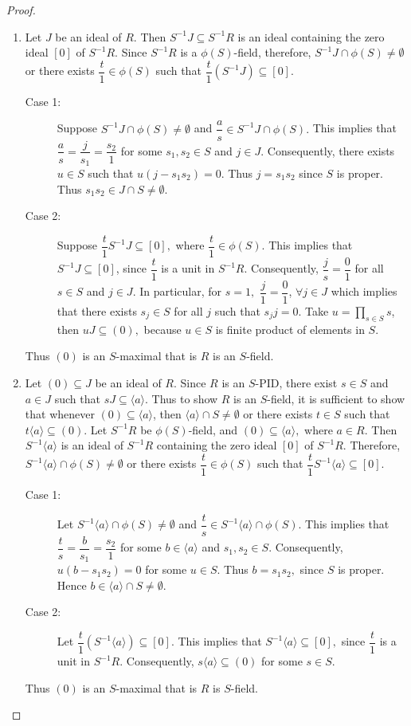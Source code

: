 \documentclass[10pt,a4paper]{amsart}
\begin{document}
	\begin{proof}
		\begin{enumerate}
			\item Let $J$ be an ideal of $R$. Then $S^{-1}J\subseteq S^{-1}R$ is an ideal containing the zero ideal $[0]$ of $S^{-1}R.$ Since $S^{-1}R$ is a $\phi(S)$-field, therefore, $S^{-1}J\cap \phi(S)\neq \emptyset $ or there exists $\dfrac{t}{1}\in \phi(S)$ such that $\dfrac{t}{1}(S^{-1}J)\subseteq [0].$
			\begin{description}
				\item[Case 1:] Suppose $S^{-1}J\cap \phi(S)\neq \emptyset$ and $\dfrac{a}{s}\in S^{-1}J\cap \phi(S).$ This implies that $\dfrac{a}{s}=\dfrac{j}{s_1}=\dfrac{s_2}{1}$ for some $s_1,s_2\in S$ and $j\in J.$ Consequently, there exists $u\in S$ such that $u(j-s_1s_2)=0$. Thus $j=s_1s_2$ since $S$ is proper. Thus $s_1s_2\in J\cap S\neq \emptyset$.
				\item[Case 2:] Suppose $\dfrac{t}{1}S^{-1}J\subseteq [0],$ where $\dfrac{t}{1}\in \phi(S)$. This implies that $S^{-1}J\subseteq [0]$, since $\dfrac{t}{1}$ is a unit in $S^{-1}R.$ Consequently, $\dfrac{j}{s}=\dfrac{0}{1}$ for all $s\in S$ and $j\in J.$ In particular, for $s=1,$ $\dfrac{j}{1}=\dfrac{0}{1}$, $\forall j\in J$ which implies that there exists $s_j\in S$ for all $j$ such that $s_j j=0.$ Take $u=\prod_{s\in S} s$, then $uJ\subseteq (0),$ because $u\in S$ is finite product of elements in $S.$
			\end{description}
			Thus $(0)$ is an $S$-maximal that is $R$ is an $S$-field.
			\item Let $(0)\subseteq J$ be an ideal of $R.$ Since $R$ is an $S$-PID, there exist $s\in S$ and $a\in J$ such that $sJ\subseteq \langle a\rangle.$ Thus to show $R$ is an $S$-field, it is sufficient to show that whenever $(0)\subseteq \langle a\rangle$, then $\langle a\rangle \cap S\neq \emptyset$ or there exists $t\in S$ such that $t\langle a\rangle\subseteq (0).$ 
			Let $S^{-1}R$ be $\phi(S)$-field, and $(0)\subseteq \langle a\rangle,$ where $a\in R$. Then $S^{-1}\langle a \rangle$ is an ideal of $S^{-1}R$ containing the zero ideal $[0]$ of $S^{-1}R.$ Therefore, $S^{-1}\langle a\rangle\cap\phi(S)\neq \emptyset$ or there exists $\dfrac{t}{1}\in \phi(S)$ such that $\dfrac{t}{1}S^{-1}\langle a\rangle \subseteq [0].$
			\begin{description}
				\item[Case 1:] Let $S^{-1}\langle a\rangle \cap \phi(S)\neq \emptyset$ and $\dfrac{t}{s}\in S^{-1}\langle a\rangle \cap \phi(S).$ This implies that $\dfrac{t}{s}=\dfrac{b}{s_1}=\dfrac{s_2}{1}$ for some $b\in\langle a\rangle $ and $s_1,s_2\in S.$ Consequently, $u(b-s_1s_2)=0$ for some $u\in S$. Thus $b=s_1s_2,$ since $S$ is proper. Hence $b\in \langle a\rangle \cap S\neq \emptyset.$
				\item[Case 2:] Let $\dfrac{t}{1}(S^{-1}\langle a\rangle)\subseteq [0]$. This implies that $S^{-1}\langle a\rangle \subseteq [0],$ since $\dfrac{t}{1}$ is a unit in $S^{-1}R$. Consequently, $s\langle a\rangle\subseteq (0)$ for some $s\in S$.
			\end{description}
			Thus $(0)$ is an $S$-maximal that is $R$ is $S$-field.
		\end{enumerate}
	\end{proof}
\end{document}
